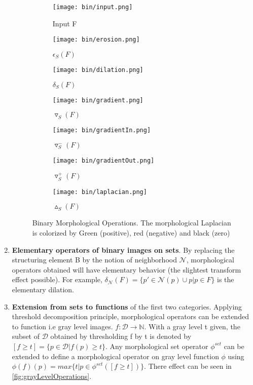 \begin{enumerate}
\begin{figure}
	\begin{subfigure}{0.2\textwidth}
	 	\texttt{[image: bin/input.png]} \caption{Input F}\label{fig:inputbin} \end{subfigure}
	\begin{subfigure}{0.2\textwidth}
	 	\texttt{[image: bin/erosion.png]} \caption{$ \epsilon_S (F)$}\label{fig:erosionbin} \end{subfigure}
	\begin{subfigure}{0.2\textwidth}
		\texttt{[image: bin/dilation.png]} \caption{$ \delta_S (F)$}\label{fig:dilationbin} \end{subfigure}
	\centering
		
	\begin{subfigure}{0.2\textwidth}
		\texttt{[image: bin/gradient.png]} 
		\caption{$ \triangledown_S (F)$}\label{fig:gradientbin} \end{subfigure}
	\begin{subfigure}{0.2\textwidth}
		\texttt{[image: bin/gradientIn.png]} 
		\caption{$ \triangledown_S ^- (F)$}\label{fig:gradientInbin} \end{subfigure}		
	\begin{subfigure}{0.2\textwidth}	
		\texttt{[image: bin/gradientOut.png]} 
		\caption{$ \triangledown_S ^+ (F)$}\label{fig:gradientOutbin} \end{subfigure}
	\begin{subfigure}{0.2\textwidth}	
		\texttt{[image: bin/laplacian.png]} 
		\caption{$\vartriangle_S (F)$}\label{fig:laplacianbin} \end{subfigure}					
	\centering
	\caption[Example of \textit{morphological operations} on binary image] {Binary Morphological Operations. The morphological Laplacian is colorized by Green (positive), red (negative) and black (zero) }
	\label{fig:binOperations}
\end{figure}


\item \textbf{Elementary operators of binary images  on sets}. By replacing the structuring element B by the notion of neighborhood $\mathcal{N}$, morphological operators obtained will have elementary behavior (the slightest transform effect possible). For example, $ \delta_\mathcal{N} (F) = \lbrace p' \in \mathcal{N}(p) \cup p  \vert  p \in F \rbrace $ is the elementary dilation.

\item \textbf{Extension from sets to functions} of the first two categories. Applying threshold decomposition principle, morphological operators can be extended to function i.e gray level images. $ f: \mathcal{D} \rightarrow \mathbb{N}$. With a gray level t given, the subset of $ \mathcal{D} $ obtained by thresholding f by t is denoted by $[f \geq t] = \lbrace p \in \mathcal{D} \vert f(p) \geq t \rbrace $. Any morphological set operator $\phi^{set}$ can be extended to define a morphological operator on gray level function $\phi$ using $ \phi(f)(p) = max \lbrace t \vert p \in \phi^{set}([f \geq t]) \rbrace $. There effect can be seen in \ref{fig:grayLevelOperations}.


\end{enumerate}
